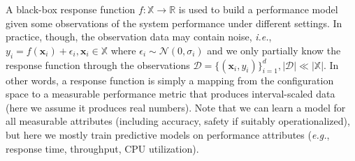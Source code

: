 A black-box response function $f:\mathbb{X}\rightarrow\mathbb{R}$ is used to build a performance model given some observations of the system performance under different settings. In practice, though, the observation data may contain noise, \emph{i.e.},~$y_i=f(\mathbf{x}_i)+\epsilon_i,\mathbf{x}_i \in \mathbb{X}$ where $\epsilon_i \sim \mathcal{N}(0,\sigma_i)$ and we only partially know the response function through the observations $\mathcal{D}=\{(\mathbf{x}_i,y_i)\}_{i=1}^d, |\mathcal{D}|\ll|\mathbb{X}|$.
In other words, a response function is simply a mapping from the configuration space to a measurable performance metric that produces interval-scaled data (here we assume it produces real numbers). Note that we can learn a model for all measurable attributes (including accuracy, safety if suitably operationalized), but here we mostly train predictive models on performance attributes (\emph{e.g.}, response time, throughput, CPU utilization).


